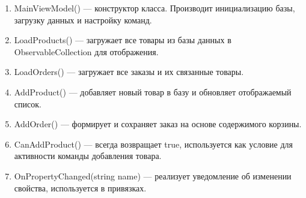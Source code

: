 \documentclass[12pt]{article}
\renewcommand{\texttt}[1]{{\small\ttfamily #1}}
\numberwithin{listing}{section}
\numberwithin{figure}{section}
\begin{document}
\begin{enumerate}
	\item \texttt{MainViewModel()} — конструктор класса. Производит инициализацию базы, загрузку данных и настройку команд.
	\item \texttt{LoadProducts()} — загружает все товары из базы данных в \texttt{ObservableCollection} для отображения.
	\item \texttt{LoadOrders()} — загружает все заказы и их связанные товары.
	\item \texttt{AddProduct()} — добавляет новый товар в базу и обновляет отображаемый список.
	\item \texttt{AddOrder()} — формирует и сохраняет заказ на основе содержимого корзины.
	\item \texttt{CanAddProduct()} — всегда возвращает true, используется как условие для активности команды добавления товара.
	\item \texttt{OnPropertyChanged(string name)} — реализует уведомление об изменении свойства, используется в привязках.
\end{enumerate}
\end{document}
